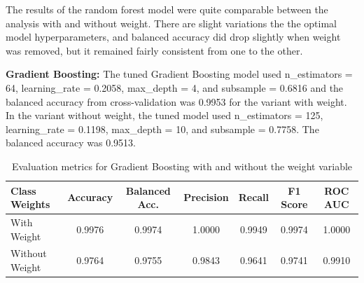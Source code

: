 \documentclass[a4paper,12pt]{article}
\begin{document}
The results of the random forest model were quite comparable between the analysis with and without weight. There are slight variations the the optimal model hyperparameters, and balanced accuracy did drop slightly when weight was removed, but it remained fairly consistent from one to the other.

\textbf{Gradient Boosting:}
The tuned Gradient Boosting model used n\_estimators = 64, learning\_rate = 0.2058, max\_depth = 4, and subsample = 0.6816 and the balanced accuracy from cross-validation was 0.9953 for the variant with weight. In the variant without weight, the tuned model used n\_estimators = 125, learning\_rate = 0.1198, max\_depth = 10, and subsample = 0.7758. The balanced accuracy was 0.9513. 

\begin{table}[H]
\centering
\small
\begin{tabular}{lcccccc}
\toprule
\textbf{Class Weights} & \textbf{Accuracy} & \textbf{Balanced Acc.} & \textbf{Precision} & \textbf{Recall} & \textbf{F1 Score} & \textbf{ROC AUC} \\
\midrule
With Weight & 0.9976 & 0.9974 & 1.0000 & 0.9949 & 0.9974 & 1.0000 \\
Without Weight & 0.9764 & 0.9755 & 0.9843 & 0.9641 & 0.9741 & 0.9910 \\
\bottomrule
\end{tabular}
\caption{Evaluation metrics for Gradient Boosting with and without the weight variable}
\label{tab:gb_weights}
\end{table}
\end{document}
